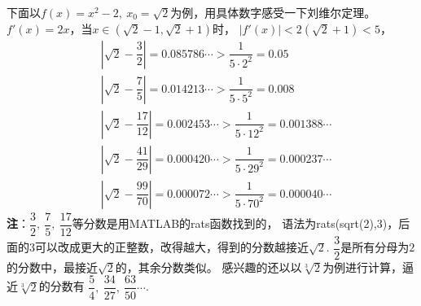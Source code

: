 \begin{itemize}[leftmargin=\inteval{\myitemleftmargin}pt,itemsep=
   \inteval{\myitemitempsep}pt,topsep=\inteval{\myitemtopsep}pt]
下面以$ f(x)=x^2-2,\ x_0=\sqrt{2} $为例，用具体数字感受一下刘维尔定理。
$ f'(x)=2x $，当$ x\in(\sqrt{2}-1,\sqrt{2}+1) $时，
$ |f'(x)|<2(\sqrt{2}+1)<5 $，
\begin{align*}
    & \left|\sqrt{2} -\dfrac{3}{2}\right|=0.085786\cdots >\dfrac{1}{5\cdot 2^2}=0.05  \\
    & \left|\sqrt{2} -\dfrac{7}{5}\right|=0.014213\cdots >\dfrac{1}{5\cdot 5^2}=0.008  \\
    & \left|\sqrt{2} -\dfrac{17}{12}\right|=0.002453\cdots >\dfrac{1}{5\cdot 12^2}=0.001388\cdots  \\
    & \left|\sqrt{2} -\dfrac{41}{29}\right|=0.000420\cdots >\dfrac{1}{5\cdot 29^2}=0.000237\cdots  \\
    & \left|\sqrt{2} -\dfrac{99}{70}\right|=0.000072\cdots >\dfrac{1}{5\cdot 70^2}=0.000040\cdots 
\end{align*}
\textbf{注}：$ \dfrac{3}{2},\ \dfrac{7}{5},\ \dfrac{17}{12} $等分数是用MATLAB的rats函数找到的，
语法为rats(sqrt(2),3)，后面的3可以改成更大的正整数，改得越大，得到的分数越接近$ \sqrt{2} $.
$ \dfrac{3}{2} $是所有分母为$ 2 $的分数中，最接近$ \sqrt{2} $的，其余分数类似。
感兴趣的还以以$ \sqrt[3]{2} $为例进行计算，逼近$ \sqrt[3]{2} $的分数有
$ \dfrac{5}{4},\ \dfrac{34}{27},\ \dfrac{63}{50}\cdots $. 

\end{itemize}

